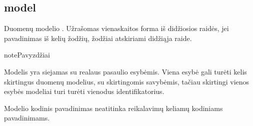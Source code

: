 \documentclass[letterpaper,10pt,lithuanian]{sphinxmanual}
\begin{document}
\subsection{model}
\label{\detokenize{dimensijos:model}}\label{\detokenize{dimensijos:id5}}\label{\detokenize{dimensijos:module-model}}
\sphinxAtStartPar
Duomenų modelio {\hyperref[\detokenize{pavadinimai:kodiniai-pavadinimai}]{}}. Užrašomas
vienaskaitos forma iš didžiosios raidės, jei pavadinimas iš kelių žodžių,
žodžiai atskiriami didžiąja raide.

\begin{sphinxadmonition}{note}{Pavyzdžiai}

\begin{DUlineblock}{0em}
\item[] 
\item[] 
\end{DUlineblock}
\end{sphinxadmonition}

\sphinxAtStartPar
Modelis yra siejamas su realaus pasaulio esybėmis. Viena esybė gali turėti
kelis skirtingus duomenų modelius, su skirtingomis savybėmis, tačiau skirtingi
vienos esybės modeliai turi turėti vienodus identifikatorius.

\begin{sphinxtopic}
\begin{description}
\sphinxAtStartPar
Modelio kodinis pavadinimas neatitinka reikalavimų keliamų kodiniams
pavadinimams.

\end{description}
\end{sphinxtopic}
\end{document}
